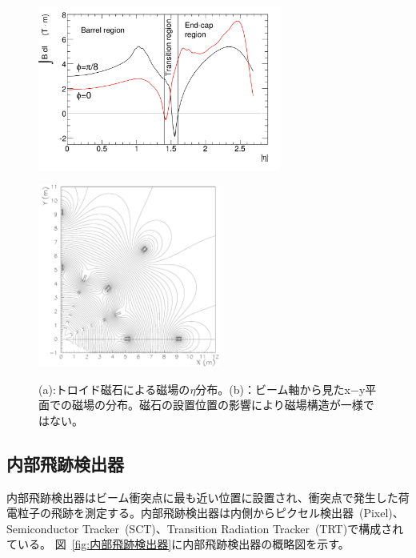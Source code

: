\begin{figure}
    \centering
    \begin{minipage}[b]{0.5\linewidth}%
        \centering
        \hspace*{-1cm}
        \includegraphics[clip, width=8cm]{fig/2/IBdl.pdf}
        \vspace{10pt}
        \subcaption{}
        \label{fig:磁場eta}
    \end{minipage}%
    \begin{minipage}[b]{0.6\linewidth}%
        \centering
        \includegraphics[clip, width=6cm]{fig/2/FMBmap.pdf}
        \vspace{10pt}
        \subcaption{}
        \label{fig:磁場平面}
    \end{minipage}%
    \caption{(a):トロイド磁石による磁場の$\eta$分布\cite{Aad:1129811}。(b)：ビーム軸から見たx−y平面での磁場の分布\cite{article:ATLASMagneticField}。磁石の設置位置の影響により磁場構造が一様ではない。}
    \label{fig:磁場}
\end{figure}




\subsection{内部飛跡検出器}
内部飛跡検出器はビーム衝突点に最も近い位置に設置され、衝突点で発生した荷電粒子の飛跡を測定する。内部飛跡検出器は内側からピクセル検出器~(Pixel)、Semiconductor Tracker~(SCT)、Transition Radiation Tracker~(TRT)で構成されている。
図~\ref{fig:内部飛跡検出器}に内部飛跡検出器の概略図を示す。

